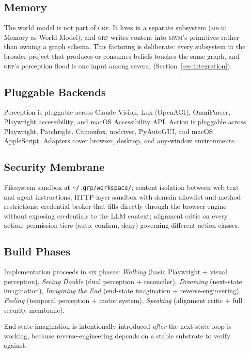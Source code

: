 \documentclass[12pt]{article}
\theoremstyle{definition}
\theoremstyle{remark}
\newcommand{\grp}{\textsc{grp}}
\begin{document}
\subsection{Memory}

The world model is not part of \grp{}. It lives in a separate
subsystem (\textsc{mwm}: Memory as World Model), and \grp{} writes
content into \textsc{mwm}'s primitives rather than owning a graph
schema. This factoring is deliberate: every subsystem in the broader
project that produces or consumes beliefs touches the same graph, and
\grp{}'s perception flood is one input among several
(Section~\ref{sec:integration}).

\subsection{Pluggable Backends}

Perception is pluggable across Claude Vision, Lux (OpenAGI),
OmniParser, Playwright accessibility, and macOS Accessibility API.
Action is pluggable across Playwright, Patchright, Camoufox,
nodriver, PyAutoGUI, and macOS AppleScript. Adapters cover browser,
desktop, and any-window environments.

\subsection{Security Membrane}

Filesystem sandbox at \texttt{\textasciitilde/.grp/workspace/};
content isolation between web text and agent instructions; HTTP-layer
sandbox with domain allowlist and method restrictions; credential
broker that fills directly through the browser engine without exposing
credentials to the LLM context; alignment critic on every action;
permission tiers (auto, confirm, deny) governing different action
classes.

\subsection{Build Phases}

Implementation proceeds in six phases:
\emph{Walking} (basic Playwright + visual perception),
\emph{Seeing Double} (dual perception + reconciler),
\emph{Dreaming} (next-state imagination),
\emph{Imagining the End} (end-state imagination + reverse-engineering),
\emph{Feeling} (temporal perception + motor system),
\emph{Speaking} (alignment critic + full security membrane).

End-state imagination is intentionally introduced \emph{after} the
next-state loop is working, because reverse-engineering depends on a
stable substrate to verify against.
\end{document}
